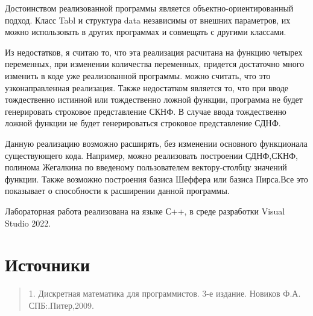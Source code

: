 \documentclass[10pt,a4paper,final]{article} %
\begin{document}
Достоинством реализованной программы является объектно-ориентированный подход. Класс Tabl и структура data независимы от внешних параметров, их можно использовать в других программах и совмещать с другими классами.

Из недостатков, я считаю то, что эта реализация расчитана на функцию четырех переменных, при изменении количества переменных, придется достаточно много изменить в коде уже реализованной программы. можно считать, что это узконаправленная реализация. Также недостатком является то, что при вводе тождественно истинной или тождественно ложной функции, программа не будет генерировать строковое представление СКНФ. В случае ввода тождественно ложной функции не будет генерироваться строковое представление СДНФ.

Данную реализацию возможно расширять, без изменении основного функционала существующего кода. Например, можно реализовать построении СДНФ,СКНФ, полинома Жегалкина по введеному пользователем вектору-столбцу значений функции. Также возможно построения базиса Шеффера или базиса Пирса.Все это показывает о способности к расширении данной программы. 

Лабораторная работа реализована на языке С++, в среде разработки Visual Studio 2022.

\newpage
\section* {Источники}
\begin{quote}
	1. Дискретная математика для программистов. 3-е издание. Новиков Ф.А.
	СПБ:.Питер,2009.
\end{quote}
	
\end{document}
